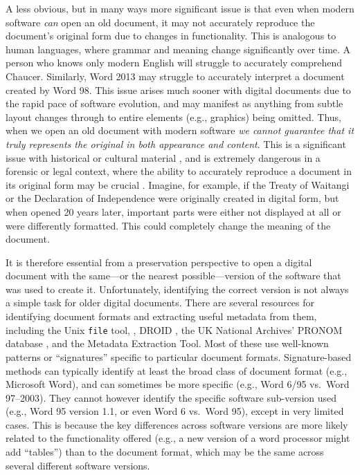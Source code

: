 \documentclass[12pt]{article}
\begin{document}
A less obvious, but in many ways more significant issue is that even when modern software \emph{can} open an old document, it may not accurately reproduce the document’s original form due to changes in functionality. This is analogous to human languages, where grammar and meaning change significantly over time. A person who knows only modern English will struggle to accurately comprehend Chaucer. Similarly, Word 2013 may struggle to accurately interpret a document created by Word 98. This issue arises much sooner with digital documents due to the rapid pace of software evolution, and may manifest as anything from subtle layout changes through to entire elements (e.g., graphics) being omitted. Thus, when we open an old document with modern software \emph{we cannot guarantee that it truly represents the original in both appearance and content}. This is a significant issue with historical or cultural material \cite{Kolowich.S-2009a-Archiving}, and is extremely dangerous in a forensic or legal context, where the ability to accurately reproduce a document in its original form may be crucial \cite{Gillespie.J-2004a-Coping}. Imagine, for example, if the Treaty of Waitangi or the Declaration of Independence were originally created in digital form, but when opened 20 years later, important parts were either not displayed at all or were differently formatted. This could completely change the meaning of the document.

It is therefore essential from a preservation perspective to open a digital document with the same—or the nearest possible—version of the software that was used to create it. Unfortunately, identifying the correct version is not always a simple task for older digital documents. There are several resources for identifying document formats and extracting useful metadata from them, including the Unix \texttt{file} tool, , DROID \cite{Brown.A-2006a-Automatic}, the UK National Archives’ PRONOM database \cite{Brown.A-2006a-PRONOM}, and the  Metadata Extraction Tool. Most of these use well-known patterns or “signatures” specific to particular document formats. Signature-based methods can typically identify at least the broad class of document format (e.g., Microsoft Word), and can sometimes be more specific (e.g., Word 6/95 vs.\ Word 97–2003). They cannot however identify the specific software sub-version used (e.g., Word 95 version 1.1, or even Word 6 vs.\ Word 95), except in very limited cases. This is because the key differences across software versions are more likely related to the functionality offered (e.g., a new version of a word processor might add “tables”) than to the document format, which may be the same across several different software versions.
\end{document}
